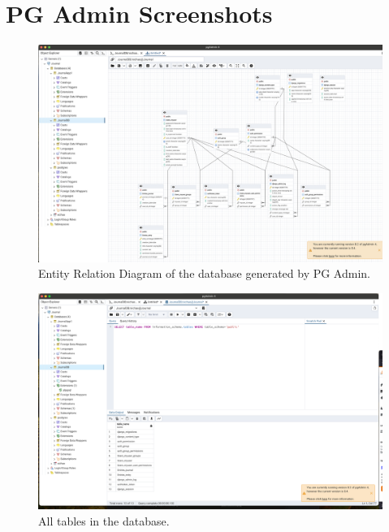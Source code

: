 \section{PG Admin Screenshots}
\begin{figure}
    \includegraphics[width=\textwidth]{Assets/pgERD.png}
    \caption{Entity Relation Diagram of the database generated by PG Admin.}
    \label{fig:pgERD}
\end{figure}

\begin{figure}
    \includegraphics[width=\textwidth]{Assets/pg_all_tables.png}
    \caption{All tables in the database.}
    \label{fig:pg_all_tables}
\end{figure}

